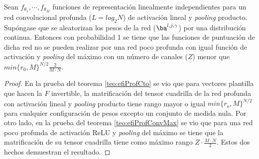 \begin{prop}
Sean $f_{\theta_1},\cdots ,f_{\theta_M}$ funciones de representación linealmente independientes para un red convolucional profunda ($L = log_2 N$) de activación lineal y \textit{pooling} producto. Supóngase que se aleatorizan los pesos de la red ($\ba^{l,j,\gamma}$) por una distribución continua. Entonces con probabilidad 1 se tiene que las funciones de puntuación de dicha red no se pueden realizar por una red poco profunda con igual función de activación y \textit{pooling} del máximo con un número de canales ($Z$) menor que $min\{r_0,M\}^{N/2}\frac{2}{M\cdot N}$.
\end{prop}
\begin{proof}
En la prueba del teorema \ref{teo:efiProfCto} se vio	 que para vectores plantilla que hacen la $F$ invertible, la matrificación del tensor cuadrilla de la red profunda con activación lineal y \textit{pooling} producto tiene rango mayor o igual $\textit{min}\{r_o,M\}^{N/2}$ para cualquier configuración de pesos excepto un conjunto de medida nula. Por otro lado, en la prueba del teorema \ref{teo:efiProfConvMax}  se vio que para una red poco profunda de activación ReLU y \textit{pooling} del máximo se tiene que la matrificación de su tensor cuadrilla tiene como máximo rango $Z \cdot \frac{M\cdot N}{2}$. Estos dos hechos demuestran el resultado.
\end{proof}


